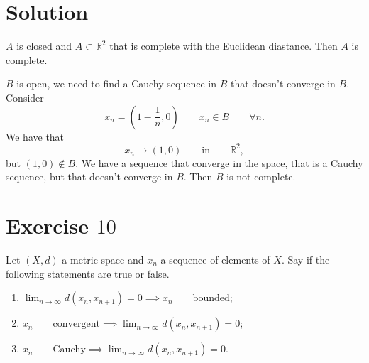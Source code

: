 \documentclass[a4paper, twoside, openany]{book}
\begin{document}
\section*{Solution}
$A$ is closed and $A \subset \mathbb{R}^2$ that is complete with the Euclidean diastance. Then $A$ is complete.
\begin{figure}[!ht]
\begin{center}
\end{center}
\end{figure} \vspace{1 cm}
$B$ is open, we need to find a Cauchy sequence in $B$ that doesn't converge in $B$. Consider
$$x_n = (1 - \frac{1}{n}, 0) \qquad x_n \in B \qquad \forall n.$$
We have that
$$x_n \rightarrow (1, 0) \qquad \textrm{in} \qquad \mathbb{R}^2,$$
but $(1, 0) \notin B$. We have a sequence that converge in the space, that is a Cauchy sequence, but that doesn't converge in $B$. Then $B$ is not complete.
\clearpage
\section*{Exercise $10$}
Let $(X, d)$ a metric space and $x_n$ a sequence of elements of $X$. Say if the following statements are true or false.
\begin{enumerate}
\item $\lim_{n \rightarrow \infty} d(x_n, x_{n+1}) = 0 \implies x_n \qquad \textrm{bounded}$;
\item $x_n \qquad \textrm{convergent} \implies \lim_{n \rightarrow \infty} d(x_n, x_{n + 1}) = 0$;
\item $x_n \qquad \textrm{Cauchy} \implies \lim_{n \rightarrow \infty} d(x_n, x_{n+1}) = 0$.
\end{enumerate}
\end{document}
